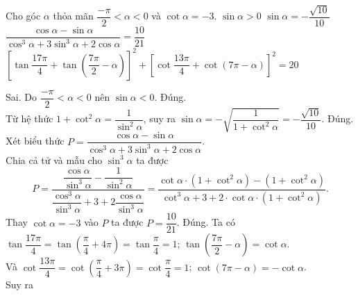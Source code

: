 \begin{ex}%
Cho góc $\alpha$ thỏa mãn $\dfrac{-\pi}{2}<\alpha<0$ và $\cot \alpha=-3$.
\choiceTF
{$\sin \alpha>0$}
{\True $\sin \alpha=-\dfrac{\sqrt{10}}{10}$}
{\True $\dfrac{\cos \alpha-\sin \alpha}{\cos ^3 \alpha+3 \sin ^3 \alpha+2 \cos \alpha}=\dfrac{10}{21}$}
{\True $\left[\tan \dfrac{17 \pi}{4}+\tan \left(\dfrac{7 \pi}{2}-\alpha\right)\right]^2+\left[\cot \dfrac{13 \pi}{4}+\cot (7 \pi-\alpha)\right]^2=20$}
\loigiai
{
\begin{itemchoice}
\itemch Sai. Do $\dfrac{-\pi}{2}<\alpha<0$ nên $\sin \alpha<0$.
\itemch Đúng.\\
Từ hệ thức $1+\cot ^2 \alpha=\dfrac{1}{\sin ^2 \alpha}$, suy ra $\sin \alpha=-\sqrt{\dfrac{1}{1+\cot ^2 \alpha}}=-\dfrac{\sqrt{10}}{10}$.
\itemch Đúng.
Xét biểu thức $P=\dfrac{\cos \alpha-\sin \alpha}{\cos ^3 \alpha+3 \sin ^3 \alpha+2 \cos \alpha}$.\\
Chia cả tử và mẫu cho $\sin ^3 \alpha$ ta được
$$
P=\dfrac{\dfrac{\cos \alpha}{\sin ^3 \alpha}-\dfrac{1}{\sin ^2 \alpha}}{\dfrac{\cos ^3 \alpha}{\sin ^3 \alpha}+3+2 \dfrac{\cos \alpha}{\sin ^3 \alpha}}=\dfrac{\cot \alpha \cdot\left(1+\cot ^2 \alpha\right)-\left(1+\cot ^2 \alpha\right)}{\cot ^3 \alpha+3+2 \cdot \cot \alpha \cdot\left(1+\cot ^2 \alpha\right)}.
$$
Thay $\cot \alpha=-3$ vào $P$ ta được $P=\dfrac{10}{21}$.
\itemch Đúng.
Ta có $\tan \dfrac{17 \pi}{4}=\tan \left(\dfrac{\pi}{4}+4 \pi\right)=\tan \dfrac{\pi}{4}=1$; $\tan \left(\dfrac{7 \pi}{2}-\alpha\right)=\cot \alpha$.\\
Và $\cot \dfrac{13 \pi}{4}=\cot \left(\dfrac{\pi}{4}+3 \pi\right)=\cot \dfrac{\pi}{4}=1$; $\cot (7 \pi-\alpha)=-\cot \alpha$.\\
Suy ra 
\end{itemchoice}
}
\end{ex}


